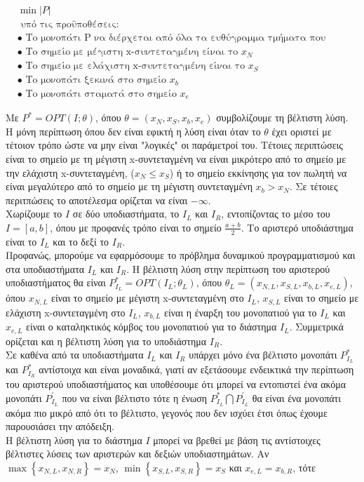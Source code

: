\documentclass[oneside,12pt]{book}
\theoremstyle{definition}
\begin{document}
\begin{align*}
	&\min |P| \\
	&\text{ υπό τις προϋποθέσεις:} \\
	&\bullet \text{ Το μονοπάτι P να διέρχεται από όλα τα ευθύγραμμα τμήματα που βρίσκονται εντός του I} \\
	&\bullet \text{ Το σημείο με μέγιστη x-συντεταγμένη είναι το } x_N  \\
	&\bullet \text{ Το σημείο με ελάχιστη x-συντεταγμένη είναι το } x_S  \\	
	&\bullet \text{ Το μονοπάτι ξεκινά στο σημείο } x_b \\
	&\bullet \text{ Το μονοπάτι σταματά στο σημείο } x_e
\end{align*}

Με \(P^* = OPT(I;θ)\), όπου \(θ = (x_N, x_S, x_b, x_e)\) συμβολίζουμε τη βέλτιστη λύση. \\
Η μόνη περίπτωση όπου δεν είναι εφικτή η λύση είναι όταν το \(θ\) έχει οριστεί με τέτοιον τρόπο ώστε να μην είναι "λογικές" οι παράμετροί του. Τέτοιες περιπτώσεις είναι το σημείο με τη μέγιστη x-συντεταγμένη να είναι μικρότερο από το σημείο με την ελάχιστη x-συντεταγμένη, (\(x_N \leq x_S\)) ή το σημείο εκκίνησης για τον πωλητή να είναι μεγαλύτερο από το σημείο με τη μέγιστη συντεταγμένη \(x_b > x_N\). Σε τέτοιες περιτπώσεις το αποτέλεσμα ορίζεται να είναι \(- \infty\). \\
Χωρίζουμε το \(I\) σε δύο υποδιαστήματα, το \(I_L\) και \(I_R\), εντοπίζοντας το μέσο του \(I = [a,b]\), όπου με προφανές τρόπο είναι το σημείο \(\frac{a + b}{2}\). Το αριστερό υποδιάστημα είναι το \(I_L\) και το δεξί το \(I_R\). \\
Προφανώς, μπορούμε να εφαρμόσουμε το πρόβλημα δυναμικού προγραμματισμού και στα υποδιαστήματα \(I_L\) και \(I_R\). Η βέλτιστη λύση στην περίπτωση του αριστερού υποδιαστήματος θα είναι \(P^{*}_{I_L} = OPT(I_L;θ_L)\), όπου \(θ_L = (x_{N,L}, x_{S,L}, x_{b,L}, x_{e,L})\), όπου \(x_{N,L}\) είναι το σημείο με μέγιστη x-συντεταγμένη στο \(I_L\), \(x_{S,L}\) είναι το σημείο με ελάχιστη x-συντεταγμένη στο \(I_L\), \(x_{b,L}\) είναι η έναρξη του μονοπατιού για το \(I_L\) και \(x_{e,L}\) είναι ο καταληκτικός κόμβος του μονοπατιού για το διάστημα \(I_L\). Συμμετρικά ορίζεται και η βέλτιστη λύση για το υποδιάστημα \(I_R\). \\
Σε καθένα από τα υποδιαστήματα \(I_L\) και \(I_R\) υπάρχει μόνο ένα βέλτιστο μονοπάτι \(P^{*}_{I_L}\) και \(P^{*}_{I_R}\) αντίστοιχα και είναι μοναδικά, γιατί αν εξετάσουμε ενδεικτικά την περίπτωση του αριστερού υποδιαστήματος και υποθέσουμε ότι μπορεί να εντοπιστεί ένα ακόμα μονοπάτι \(P^{'}_{Ι_L}\) που να είναι βέλτιστο τότε η ένωση \(P^{*}_{Ι_L} \bigcap P^{'}_{Ι_L}\) θα είναι ένα μονοπάτι ακόμα πιο μικρό από ότι το βέλτιστο, γεγονός που δεν ισχύει έτσι όπως έχουμε παρουσιάσει την απόδειξη. \\
Η βέλτιστη λύση για το διάστημα \(Ι\) μπορεί να βρεθεί με βάση τις αντίστοιχες βέλτιστες λύσεις των αριστερών και δεξιών υποδιαστημάτων. Αν \(\max \left\{ x_{N,L}, x_{N,R} \right\} = x_N\), \(\min \left\{ x_{S,L}, x_{S,R} \right\} = x_S\) και \(x_{e,L} = x_{b,R}\), τότε
\end{document}
